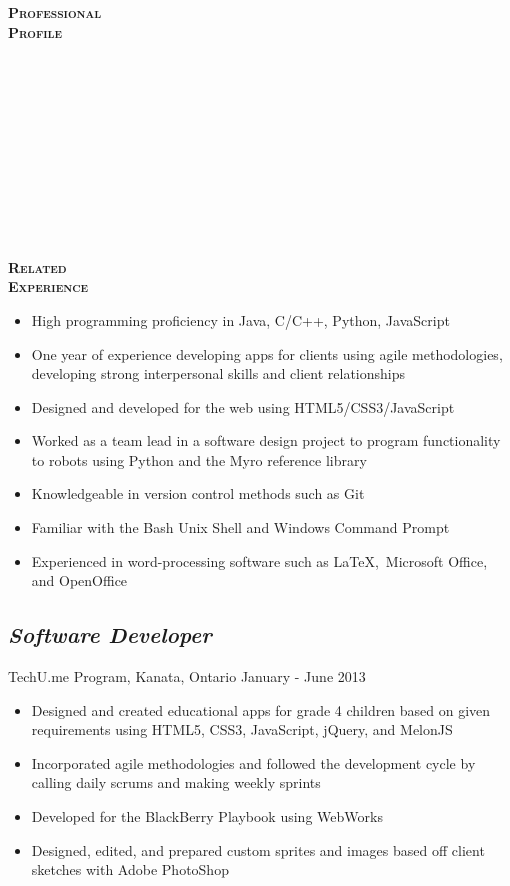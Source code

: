 \documentclass[12pt]{article}
\begin{document}
\begin{minipage}[t]{0.2\linewidth} 
	\textbf{\textsc{
	\hspace{-5pt}Professional\\Profile \\ \\ \\ \\ \\ \\ \\ \\ \\ \\ \\ \\
	Related\\Experience
	}}
\end{minipage}
\begin{minipage}[t]{0.8\linewidth} 
	\begin{itemize}
		\item High programming proficiency in Java, C/C++, Python, JavaScript
		\item One year of experience developing apps for clients using agile methodologies, developing strong 						interpersonal skills and client relationships
		\item Designed and developed for the web using HTML5/CSS3/JavaScript
		\item Worked as a team lead in a software design project to program functionality to robots using Python
				and the Myro reference library
		\item Knowledgeable in version control methods such as Git
		\item Familiar with the Bash Unix Shell and Windows Command Prompt
		\item Experienced in word-processing software such as \LaTeX,\ Microsoft Office, and OpenOffice
	\end{itemize} \vspace{12pt}

	\subsection*{\textit{Software Developer}} \vspace{-6pt} 
		TechU.me Program, Kanata, Ontario \hspace{72pt} January - June 2013
		\begin{itemize}
			\item Designed and created educational apps for grade 4 children based on given requirements using 			 				HTML5, CSS3, JavaScript, jQuery, and MelonJS
			\item Incorporated agile methodologies and followed the development cycle by calling daily scrums and 						making weekly sprints
			\item Developed for the BlackBerry Playbook using WebWorks
			\item Designed, edited, and prepared custom sprites and images based off client sketches with Adobe 							PhotoShop
		\end{itemize}
		

\end{minipage}
\end{document}
